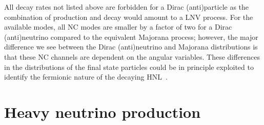 %

All decay rates not listed above are forbidden for a Dirac (anti)particle as the combination of production %
and decay would amount to a LNV process.
% 
For the available modes, all NC modes are smaller by a factor of two for a Dirac (anti)neutrino compared %
to the equivalent Majorana process; however, the major difference we see between the Dirac (anti)neutrino and Majorana distributions %
is that these NC channels are dependent on the angular variables.
These differences in the distributions of the final state particles could be in principle exploited to identify %
the fermionic nature of the decaying HNL~\cite{Balantekin:2018ukw}.


\section{Heavy neutrino production}
\label{sec:production}

